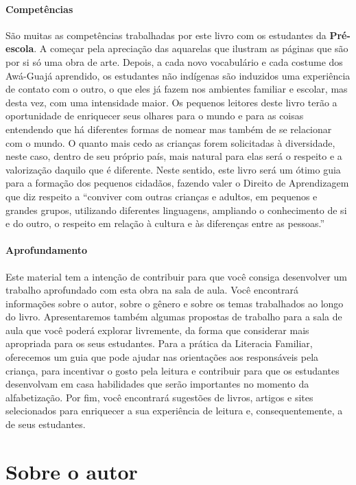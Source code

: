 \documentclass[11pt]{extarticle}
\begin{document}
\paragraph{Competências} 
São muitas as competências trabalhadas por este livro com os estudantes da \textbf{Pré-escola}.
A começar pela apreciação das aquarelas que ilustram as páginas que são por si só uma
obra de arte. Depois, a cada novo vocabulário e cada costume dos Awá-Guajá aprendido, 
os estudantes não indígenas são induzidos uma experiência de contato com o outro, o que eles 
já fazem nos ambientes familiar e escolar, mas desta vez, com uma intensidade maior. Os pequenos 
leitores deste livro terão a oportunidade de enriquecer seus olhares para o mundo e para as coisas
entendendo que há diferentes formas de nomear mas também de se relacionar com o mundo.
O quanto mais cedo as crianças forem solicitadas à diversidade, neste caso, dentro de
seu próprio país, mais natural para elas será o respeito e a valorização daquilo que 
é diferente. Neste sentido, este livro será um ótimo guia para a formação dos pequenos cidadãos, 
fazendo valer o Direito de Aprendizagem que diz respeito a ``conviver com outras crianças e adultos, em pequenos e grandes grupos, utilizando diferentes linguagens, ampliando o conhecimento de si e do outro, o respeito em relação à cultura e às diferenças entre as pessoas.''

\paragraph{Aprofundamento} 
Este material tem a intenção de contribuir para que você consiga desenvolver um trabalho aprofundado 
com esta obra na sala de aula. Você encontrará informações sobre o autor, sobre 
o gênero e sobre os temas trabalhados ao longo do livro. Apresentaremos também 
algumas propostas de trabalho para a sala de aula que você poderá explorar livremente, 
da forma que considerar mais apropriada para os seus estudantes. Para a prática 
da Literacia Familiar, oferecemos um guia que pode ajudar nas orientações aos 
responsáveis pela criança, para incentivar o gosto pela leitura e contribuir para 
que os estudantes desenvolvam em casa habilidades que serão importantes no momento 
da alfabetização. Por fim, você encontrará sugestões de livros, artigos e sites 
selecionados para enriquecer a sua experiência de leitura e, 
consequentemente, a de seus estudantes.


\section{Sobre o autor}
\end{document}
